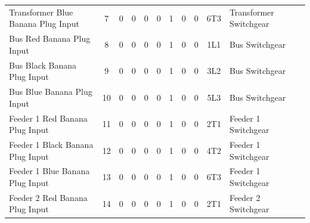 \begin{table}[!htp]
{\begin{tabular}{lcccccccccll}
			Transformer Blue Banana Plug Input  & 7                       & 0                                           & 0                                          & 0           & 0           & 1            & 0                & 0 & 6T3                          & Transformer Switchgear           &                \\
			Bus Red Banana Plug Input           & 8                       & 0                                           & 0                                          & 0           & 0           & 1            & 0                & 0 & 1L1                          & Bus Switchgear                   &                \\
			Bus Black Banana Plug Input         & 9                       & 0                                           & 0                                          & 0           & 0           & 1            & 0                & 0 & 3L2                          & Bus Switchgear                   &                \\
			Bus Blue Banana Plug Input          & 10                      & 0                                           & 0                                          & 0           & 0           & 1            & 0                & 0 & 5L3                          & Bus Switchgear                   &                \\
			Feeder 1 Red Banana Plug Input      & 11                      & 0                                           & 0                                          & 0           & 0           & 1            & 0                & 0 & 2T1                          & Feeder 1 Switchgear              &                \\
			Feeder 1 Black Banana Plug Input    & 12                      & 0                                           & 0                                          & 0           & 0           & 1            & 0                & 0 & 4T2                          & Feeder 1 Switchgear              &                \\
			Feeder 1 Blue Banana Plug Input     & 13                      & 0                                           & 0                                          & 0           & 0           & 1            & 0                & 0 & 6T3                          & Feeder 1 Switchgear              &                \\
			Feeder 2 Red Banana Plug Input      & 14                      & 0                                           & 0                                          & 0           & 0           & 1            & 0                & 0 & 2T1                          & Feeder 2 Switchgear              &                \\

\end{tabular}}
\end{table}
